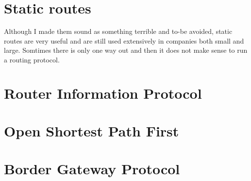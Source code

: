 \section{Static routes}

Although I made them sound as something terrible and to-be avoided, static routes are very useful and are still used extensively in companies both small and large.
Somtimes there is only one way out and then it does not make sense to run a routing protocol.



\section{Router Information Protocol}

\section{Open Shortest Path First}

\section{Border Gateway Protocol}

